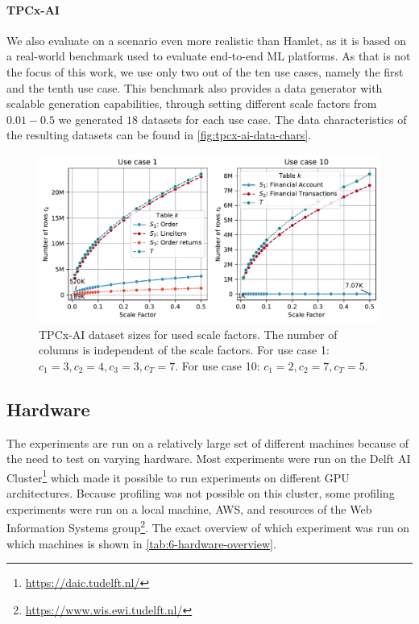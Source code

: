 \paragraph{TPCx-AI \cite{tpcx-ai}} We also evaluate on a scenario even more realistic than Hamlet, as it is based on a real-world benchmark used to evaluate end-to-end ML platforms. As that is not the focus of this work, we use only two out of the ten use cases, namely the first and the tenth use case. This benchmark also provides a data generator with scalable generation capabilities, through setting different scale factors from $0.01-0.5$ we generated $18$ datasets for each use case. The data characteristics of the resulting datasets can be found in \autoref{fig:tpcx-ai-data-chars}.
\begin{figure}
  \centering
  \includegraphics[width=\linewidth]{chapters/06_evaluation/figures/tpcx-ai-data-chars.pdf}
  \caption[TPCx-AI dataset sizes for used scale factors.]{TPCx-AI dataset sizes for used scale factors. The number of columns is independent of the scale factors. For use case 1: $c_1=3, c_2=4, c_3=3, c_T=7$. For use case 10: $c_1=2, c_2=7, c_T=5$.}
  \label{fig:tpcx-ai-data-chars}
\end{figure}




\subsection{Hardware}
\label{subsec:6-hardware}

The experiments are run on a relatively large set of different machines because of the need to test on varying hardware. Most experiments were run on the Delft AI Cluster\footnote{\url{https://daic.tudelft.nl/}} which made it possible to run experiments on different GPU architectures. Because profiling was not possible on this cluster, some profiling experiments were run on a local machine, AWS, and resources of the Web Information Systems group\footnote{\url{https://www.wis.ewi.tudelft.nl/}}. The exact overview of which experiment was run on which machines is shown in \autoref{tab:6-hardware-overview}.


